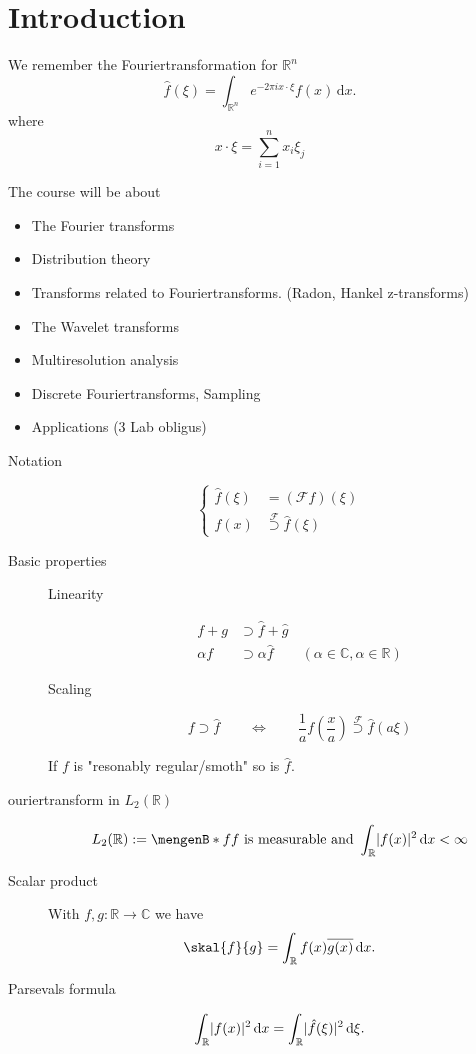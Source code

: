 \section{Introduction} 
\label{sec:introduction}
\begin{definition*}[Fouriertransforms]
	We remember the Fouriertransformation for $\mathbb{R}^n$
	\[
		\hat{f}(\xi) = \int_{\mathbb{R}^n}^{}e^{-2 \pi i x \cdot \xi} f(x) \,\mathrm{d}x.
	\]
	where
	\[
		x \cdot \xi = \sum^{n}_{i=1}x_i \xi_j
	\]
\end{definition*}
The course will be about
\begin{itemize}
	\item The Fourier transforms
	\item Distribution theory
	\item Transforms related to Fouriertransforms. (Radon, Hankel z-transforms)
	\item The Wavelet transforms
	\item Multiresolution analysis
	\item Discrete Fouriertransforms, Sampling
	\item Applications (3 Lab obligus)
\end{itemize}
\begin{description}
	\item[Notation] 
	\[
		\begin{cases}
			\hat{f}(\xi) &= (\mathcal{F}f)(\xi) \\
			f(x) &\stackrel{\mathcal{F}}{\supset} \hat{f}(\xi)
		\end{cases}
	\]
\item[Basic properties]
\begin{description}
	\item[Linearity] \begin{align*}
		f + g &\supset \hat{f} + \hat{g} \\
		\alpha f &\supset \alpha \hat{f} \qquad (\alpha \in \mathbb{C}, \alpha \in \mathbb{R}) 
	\end{align*} 
	\item[Scaling] \[
		f \supset \hat{f} \qquad \Leftrightarrow \qquad \frac{1}{a}f ( \frac{x}{a}) \stackrel{\mathcal{F}}{\supset} \hat{f}(a \xi)
	\]
\end{description}
If $f$ is "resonably regular/smoth" so is $\hat{f}$.
\item[ouriertransform in $L_2(\mathbb{R})$]
\[
	L_2(\mathbb{R}):= \set[f]{f \text{ is measurable and } \int_{\mathbb{R}}^{}\abs{f(x)}^2 \,\mathrm{d}x < \infty}
\]
\item[Scalar product]
With $f,g :\mathbb{R} \to \mathbb{C}$ we have
\[
	\skal{f}{g} = \int_{\mathbb{R}}^{} f(x) \overline{g(x)} \,\mathrm{d}x.
\]
\item[Parsevals formula]
\[
	\int_{\mathbb{R}}^{}\lvert f(x)\rvert^2 \,\mathrm{d}x = \int_{\mathbb{R}}^{} \lvert\hat{f}(\xi)\rvert^2 \,\mathrm{d}\xi.
\]
\end{description}
